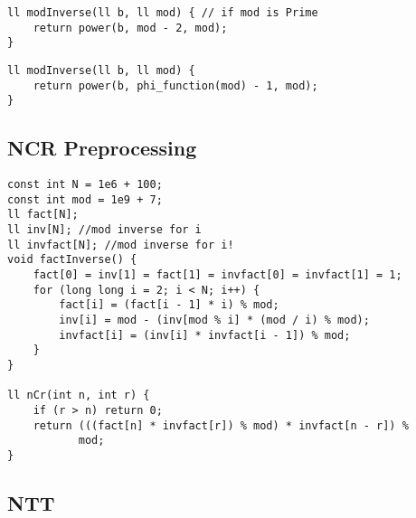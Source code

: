 \begin{lstlisting}[style=cpp]
ll modInverse(ll b, ll mod) { // if mod is Prime  
    return power(b, mod - 2, mod);  
}
\end{lstlisting}

\begin{lstlisting}[style=cpp]
ll modInverse(ll b, ll mod) { 
    return power(b, phi_function(mod) - 1, mod);  
}
\end{lstlisting}

\subsection{NCR Preprocessing}

\begin{lstlisting}[style=cpp]
const int N = 1e6 + 100;  
const int mod = 1e9 + 7;  
ll fact[N];  
ll inv[N]; //mod inverse for i  
ll invfact[N]; //mod inverse for i!  
void factInverse() {  
    fact[0] = inv[1] = fact[1] = invfact[0] = invfact[1] = 1;  
    for (long long i = 2; i < N; i++) {  
        fact[i] = (fact[i - 1] * i) % mod;  
        inv[i] = mod - (inv[mod % i] * (mod / i) % mod);  
        invfact[i] = (inv[i] * invfact[i - 1]) % mod;  
    }  
}  
  
ll nCr(int n, int r) {  
    if (r > n) return 0;  
    return (((fact[n] * invfact[r]) % mod) * invfact[n - r]) %  
           mod;  
}
\end{lstlisting}

\subsection{NTT}

